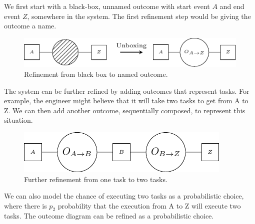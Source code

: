         We first start with a black-box, unnamed outcome with start event $A$ and end event $Z$, somewhere in the system. The first refinement step would be giving the outcome a name.

      \begin{figure}[H]
            \begin{center}
                \includegraphics[scale = 1]{tikz/black_box.pdf}
            \end{center}
            \caption{Refinement from black box to named outcome.}
            \label{fig:bb}
        \end{figure}

    The system can be further refined by adding outcomes that represent tasks. For example, the engineer might believe that it will take two tasks to get from A to Z. We can then add another outcome, sequentially composed, to represent this situation.

       \begin{figure}[H]
            \begin{center}
                \includegraphics[scale = 1]{tikz/out_2.pdf}
            \end{center}
            \caption{Further refinement from one task to two tasks.}
            \label{fig:2_hops}
        \end{figure}

        We can also model the chance of executing two tasks as a probabilistic choice, where there is $p_2$ probability that the execution from A to Z will execute two tasks. The outcome diagram can be refined as a probabilistic choice.

